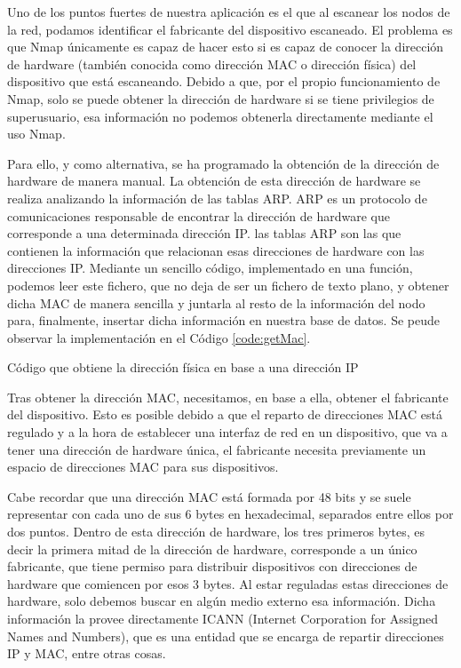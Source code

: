 Uno de los puntos fuertes de nuestra aplicación es el que al escanear los nodos de la red, podamos identificar el fabricante del dispositivo escaneado. El problema es que Nmap únicamente es capaz de hacer esto si es capaz de conocer la dirección de hardware (también conocida como dirección MAC o dirección física) del dispositivo que está escaneando. Debido a que, por el propio funcionamiento de Nmap, solo se puede obtener la dirección de hardware si se tiene privilegios de superusuario, esa información no podemos obtenerla directamente mediante el uso Nmap.

Para ello, y como alternativa, se ha programado la obtención de la dirección de hardware de manera manual. La obtención de esta dirección de hardware se realiza analizando la información de las tablas ARP. ARP es un protocolo de comunicaciones responsable de encontrar la dirección de hardware que corresponde a una determinada dirección IP.  las tablas ARP son las que contienen la información que relacionan esas direcciones de hardware con las direcciones IP. Mediante un sencillo código, implementado en una función, podemos leer este fichero, que no deja de ser un fichero de texto plano, y obtener dicha MAC de manera sencilla y juntarla al resto de la información del nodo para, finalmente, insertar dicha información en nuestra base de datos. Se peude observar la implementación en el Código \ref{code:getMac}.

\begin{code}
	\caption{Código que obtiene la dirección física en base a una dirección IP}
	\label{code:getMac}
	
\end{code}

Tras obtener la dirección MAC, necesitamos, en base a ella, obtener el fabricante del dispositivo. Esto es posible debido a que el reparto de direcciones MAC está regulado y a la hora de establecer una interfaz de red en un dispositivo, que va a tener una dirección de hardware única, el fabricante necesita previamente un espacio de direcciones MAC para sus dispositivos.

Cabe recordar que una dirección MAC está formada por 48 bits y se suele representar con cada uno de sus 6 bytes en hexadecimal, separados entre ellos por dos puntos. Dentro de esta dirección de hardware, los tres primeros bytes, es decir la primera mitad de la dirección de hardware, corresponde a un único fabricante, que tiene permiso para distribuir dispositivos con direcciones de hardware que comiencen por esos 3 bytes. Al estar reguladas estas direcciones de hardware, solo debemos buscar en algún medio externo esa información. Dicha información la provee directamente ICANN (Internet Corporation for Assigned Names and Numbers), que es una entidad que se encarga de repartir direcciones IP y MAC, entre otras cosas.


